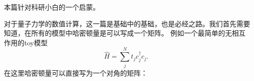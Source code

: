 
\begin{issues}
\issueDraft       %
\end{issues}
本篇针对科研小白的一个启蒙。

对于量子力学的数值计算，这一篇是基础中的基础，也是必经之路。我们首先需要知道，在所有的模型中哈密顿量是可以写成一个矩阵。
例如一个最简单的无相互作用的toy模型
\begin{equation}\label{ham1}
\hat{H}=  \sum_j^{N} t_j c_j^{\dagger}c_j.~
\end{equation}
在这里哈密顿量可以直接写为一个对角的矩阵：

